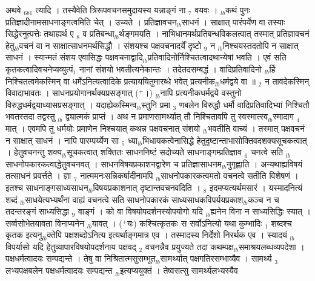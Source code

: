 \documentclass[article,12pt,a4paper]{memoir}%
\newcommand{\add}[1]{($^{+}$#1)}
\begin{document}
	  
	  \pstart \leavevmode%
	\hphantom{.}{\color{DodgerBlue3}अथवे} {\tiny $_{6b1}$} त्यादि । तस्यैवेति त्रिरूपवचनसमुदायस्य यन्नाङ्गं ना {\tiny $_{7}$} वयवः । {\tiny $_{lb}$}कथं पुनः प्रतिज्ञादीनामसाधनाङ्गत्वमिति चेत् । उच्यते । प्रतिज्ञावचन{\tiny $_{lb}$}साधनं । साक्षात् पारंपर्येण वा तस्याः सिद्धेरनुत्पत्तेः तथाह्यर्थ ए {\tiny $_{8}$} व प्रतिबन्धा{\tiny $_{lb}$}र्थङ्गमयति । नाभिधानमर्थप्रतिबन्धविकलत्वात् तस्मात् प्रतिज्ञावचनं हेतु{\tiny $_{lb}$}वचनं वा न साक्षात्साधनमर्थसिद्धौ । संशयश्च पक्षवचनादर्यें दृष्टो {\tiny $_{9}$} \leavevmode{} न {\tiny $_{lb}$}निश्चयस्तदतोपि न साक्षात् साधनं । स्यान्मतं संशय एवासिद्धः पक्षवचनाद्वादि{\tiny $_{lb}$}प्रतिवादिनोर्निश्चितत्वादथान्येषां भवति । एवं सति कृतकत्वादिवचनेप्यव्युत्पं{\tiny $_{1}$} नानां संशयो भवतीत्यनेकान्तः । तदेतदसम्बद्धं । वादिप्रतिवादिनो {\tiny $_{lb}$}र्हि निश्चितत्वमेकस्मिन् वा धर्मेऽनित्यत्वादिके प्रत्याययितुमारब्धे भवेत् प्रत्यनीक{\tiny $_{lb}$}धर्मद्वये वा ॥ {\tiny $_{2}$} न तावदेकस्मिन् विवादाभावतः । साधनप्रयोगानर्थक्यप्रसङ्गात् \add{।} {\tiny $_{lb}$}नापि प्रत्यनीकधर्मद्वये वस्तुनो विरुद्धधर्मद्वयाध्यासप्रसङ्गात् । यदाह्येकस्मिन्व{\tiny $_{lb}$}स्तुनि प्रमा {\tiny $_{3}$} णबलेन विरुद्धौ धर्मौ वादिप्रतिवादिभ्यां निश्चितौ भवतस्तदा तद्वस्तु {\tiny $_{lb}$} \leavevmode{} द्व्यात्मकं प्राप्तं । अथ न प्रमाणसामर्थ्यात् तौ निश्चितावपि तु स्वस्मात्स्व{\tiny $_{lb}$}स्मादाग {\tiny $_{4}$} मात् । एवमपि तु धर्मयोः प्रमाणेन निश्चयात् कथन्न पक्षवचनात् संशयो {\tiny $_{lb}$}भवतीति वाच्यं । तस्मात् पक्षवचनं न साक्षात् साधनं । नापि पारम्पर्य्येण सा {\tiny $_{5}$} ध्या{\tiny $_{lb}$}भिधायकत्वेनासिद्धे हेतुदृष्टान्ताभासोक्तिवदशक्यसूचकत्वात् । हेतुवचनन्तु शक्य{\tiny $_{lb}$}सूचकत्वात् शक्तितः साधननिष्टं सदोच्यते साधनाङ्गम्प्रतिज्ञाव {\tiny $_{6}$} चनत्वे सति {\tiny $_{lb}$}साधनोपकारकत्वाद्धेतुवचनवत् । साधनविषयप्रकाशनद्वारेण च प्रतिज्ञासाधनम{\tiny $_{lb}$}नुगृह्णाति । अन्यथाह्यविषयं तत्साधनं प्रवर्त्तते । ज्ञा {\tiny $_{7}$} नात्ममनःसन्निकर्षादीनामपि {\tiny $_{lb}$}साधनोपकारकत्वमतो वचनत्वे सतीति विशेषणं । इतश्च साधनाङ्गसाध्यसाधन{\tiny $_{lb}$}विषयप्रकाशनात् दृष्टान्तवचनवदिति । {\tiny $_{8}$} इदमप्यत्यर्थमसारं । यस्मादनित्यं शब्दं {\tiny $_{lb}$}साधयेत्यभ्यर्थंना वाह्यं वचनत्वे सति साधनोपकारकं साध्यसाधकविपर्ययप्रकाश{\tiny $_{lb}$}कञ्च न च तदन्तरङ्गं साध्यसिद्धा {\tiny $_{9}$} \leavevmode{} वाङ्गं । को वा विषयोपदर्शनस्योपयोगो यदि {\tiny $_{lb}$}ह्यनेन विना न साध्यसिद्धिः स्यात् । {\color{DodgerBlue3}सर्व्व}सोभेतयावता विनाप्यनेन {\tiny $_{lb}$}यावत् । \add{यः} कश्चित्कृतकः स सर्वोऽनित्यो यथा कुम्भादिः {\tiny $_{1}$} शब्दश्च कृतक इत्यनु{\tiny $_{lb}$}क्तेपि पक्षशब्दोऽनित्य इत्यर्थाङ्गमात्र एव । तस्मादस्य निर्देशो निरर्थक एव । स्यादयं {\tiny $_{lb}$}विपर्यासो यदि हेतुव्यापारविषयोपदर्शनाय पक्षवद् {\tiny $_{2}$} वचनन्नैव प्रयुज्यते तदा कथम्पक्ष{\tiny $_{lb}$}समाश्रयलब्धव्यपदेशा । पक्षधर्मत्वादयः सम्पद्यन्ते । तेषु वा निश्रितात्मसुसम्भूत{\tiny $_{lb}$}सामर्थ्यात् पक्षगतिरसम्भाव्यैव । सामर्थ्य {\tiny $_{3}$} लभ्यपक्षबलेन पक्षधर्मत्वादयः सम्पद्यन्त {\tiny $_{lb}$}इत्यप्ययुक्तं । तेष्वसत्सु सामर्थ्यलभ्यस्यैव 
\end{document}
